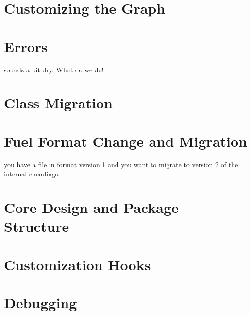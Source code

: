 \documentclass[a4paper,10pt,twoside]{book}
\begin{document}
\section{Customizing the Graph}

\section{Errors}
sounds a bit dry. What do we do!


\section{Class Migration}

\section{Fuel Format Change and Migration}

you have a file in format version 1 and you want to migrate to version 2 of the internal encodings.

\section{Core Design and Package Structure}

\section{Customization Hooks}

\section{Debugging}




\ifx\wholebook\relax\else
   
   
\end{document}
